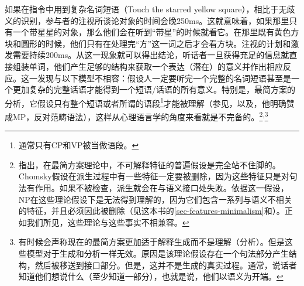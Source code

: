 如果在指令中用到复杂名词短语（Touch the starred yellow square），相比于无歧义的识别，参与者的注视所谈论对象的时间会晚250ms。这就意味着，如果那里只有一个带星星的对象，那么他们会在听到“带星”的时候就看它。在那里既有黄色方块和圆形的时候，他们只有在处理完“方”这一词之后才会看方块\citep[]{TSKES95a}。注视的计划和激发需要持续200ms。从这一现象就可以得出结论，听话者一旦获得充足的信息就直接组装单词，他们产生足够的结构来获取一个表达（潜在）的意义并作出相应反应。这一发现与以下模型不相容：假设人一定要听完一个完整的名词短语甚至是一个更加复杂的完整话语才能得到一个短语/话语的所有意义。特别是，最简方案\indexmpc 的分析，它假设只有整个短语或者所谓的语段\footnote{%
     通常只有CP和VP被当做语段。
}才能被理解（参见\citealp{Chomsky99a}，以及\citealp[]{Marantz2005a}，他明确赞成MP\indexmpc，反对范畴语法\indexcgc），这样从心理语言学的角度来看就是不完备的。\footnote{%
 \citet[--730]{Sternefeld2006a-u}指出，在最简方案理论中，不可解释特征的普遍假设是完全站不住脚的。Chomsky假设在派生过程中有一些特征一定要被删除，因为这些特征只是对句法有作用。如果不被检查，派生就会在与语义接口处失败。依据这一假设，NP在这些理论假设下是无法得到理解的，因为它们包含一系列与语义不相关的特征，并且必须因此被删除（见这本书的\ref{sec-features-minimalism}和\citealp{Richards2015a}）。正如我们所见，这些理论与这些事实不相兼容。
}$^,$\footnote{%
有时候会声称现在的最简方案更加适于解释生成而不是理解（分析）。但是这些模型对于生成和分析一样无效。原因是该理论假设存在一个句法部分产生结构，然后被移送到接口部分。但是，这并不是生成的真实过程。通常，说话者知道他们想说什么（至少知道一部分），也就是说，他们以语义为开端。
}
